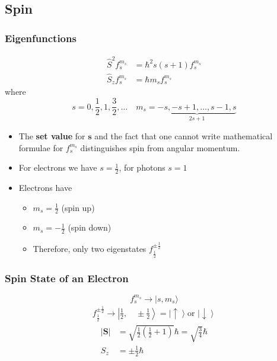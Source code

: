 \subsection{Spin}
\subsubsection{Eigenfunctions}

\noindent\begin{align*}
    \widehat{S}^2f_{s}^{m_s}   & =\hbar^{2}s (s+1) f_{s}^{m_s} \\
    \widehat{S}_{z}f_{s}^{m_s} & =\hbar m_s f_{s}^{m_s}
\end{align*}
where
\begin{equation*}
    s =0,\frac{1}{2},1,\frac{3}{2},\dots \quad m_s =\underbrace{-s, -s+1,\dots, s-1, s}_{2s+1}
\end{equation*}

\begin{itemize}
    \item The \textbf{set value} for $\mathbf{s}$ and the fact that one cannot write mathematical formulae for $f_{s}^{m_s}$ distinguishes spin from angular momentum.
    \item For electrons we have $s=\frac{1}{2}$, for photons $s=1$
    \item Electrons have
          \begin{itemize}
              \item $m_s=\frac{1}{2}$ (spin up)
              \item $m_s=-\frac{1}{2}$ (spin down)
              \item Therefore, only two eigenstates $f_{\frac{1}{2}}^{\pm \frac{1}{2}}$
          \end{itemize}
\end{itemize}

\subsubsection{Spin State of an Electron}
\noindent\begin{equation*}
    f_{s}^{m_{s}}\rightarrow|s,m_{s}\rangle
\end{equation*}
\noindent\begin{align*}
    f_{\frac{1}{2}}^{\pm\frac{1}{2}} \rightarrow\left|\frac{1}{2},\quad \pm\frac{1}{2}\right>= \left|\uparrow\right> \text{or } \left|\downarrow\right>
\end{align*}
\begin{align*}
    |\mathbf{S}| & =\sqrt{\frac{1}{2}\left(\frac{1}{2}+1\right)}\hbar=\sqrt{\frac{3}{4}}\hbar \\
    S_z          & =\pm \frac{1}{2}\hbar
\end{align*}

